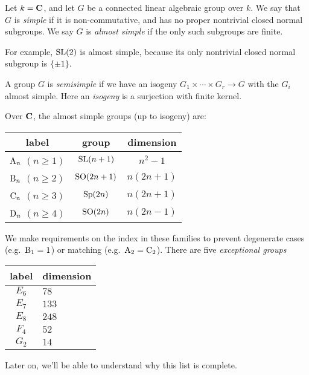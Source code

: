 \begin{example}[Semisimple]
Let $k=\mathbf{C}$, and let $G$ be a connected linear 
algebraic group over $k$. We say that $G$ is \emph{simple} if it is 
non-commutative, and has no proper nontrivial closed normal subgroups. We say 
$G$ is \emph{almost simple} if the only such subgroups are finite. 

For example, $\operatorname{SL}(2)$ is almost simple, because its only nontrivial 
closed normal subgroup is $\{\pm 1\}$. 

A group $G$ is \emph{semisimple} if we have an isogeny 
$G_1\times \cdots \times G_r\to G$ with the $G_i$ almost simple. Here an 
\emph{isogeny} is a surjection with finite kernel. 
\end{example}

Over $\mathbf{C}$, the almost simple groups (up to isogeny) are: 
\begin{center}
\begin{tabular}{c|c|c}
label & group & dimension \\ \hline
$\mathrm{A}_n$ $(n\geqslant 1)$ & $\operatorname{SL}(n+1)$ & $n^2-1$ \\
$\mathrm{B}_n$ $(n\geqslant 2)$ & $\operatorname{SO}(2n+1)$ & $n(2n+1)$\\
$\mathrm{C}_n$ $(n\geqslant 3)$ & $\operatorname{Sp}(2n)$ & $n(2n+1)$ \\
$\mathrm{D}_n$ $(n\geqslant 4)$ & $\operatorname{SO}(2n)$ & $n(2n-1)$
\end{tabular}
\end{center}
We make requirements on the index in these families to prevent degenerate 
cases (e.g.~$\mathrm{B}_1=1$) or matching (e.g.~$\mathrm{A}_2=\mathrm{C}_2$). There are 
five \emph{exceptional groups} 
\begin{center}
\begin{tabular}{c|l}
label & dimension \\ \hline
$E_6$ & $78$ \\
$E_7$ & $133$ \\
$E_8$ & $248$ \\
$F_4$ & $52$ \\
$G_2$ & $14$
\end{tabular}
\end{center}
Later on, we'll be able to understand why this list is complete.
